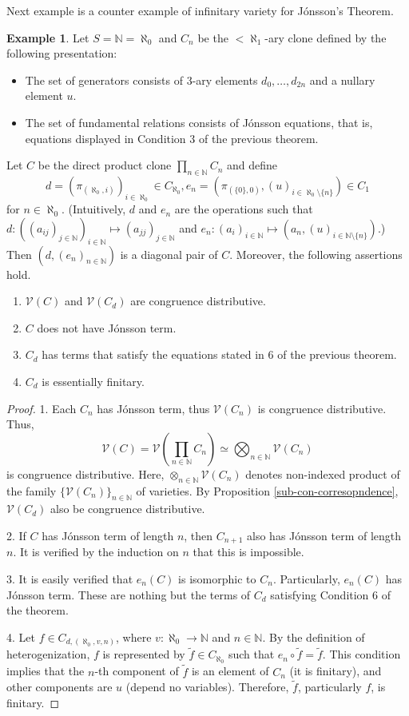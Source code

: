 \documentclass[a4paper,10pt]{article}
\theoremstyle{definition}
\newtheorem{eg}[df]{Example}
\newcommand\ra{\rightarrow}
\newcommand\iso{{\simeq}}
\newcommand\sm{\setminus}
\newcommand\mc{\mathclose}
\newcommand\N{\mathbb{N}}
\newcommand\V{\mathcal{V}}
\begin{document}
Next example is a counter example of infinitary variety for J\'onsson's Theorem.
\begin{eg}
Let $S=\N=\aleph_0$ and $C_n$ be the $<\mc\aleph_1$-ary clone defined by the following presentation:
\begin{itemize}
\item
The set of generators consists of 3-ary elements $d_0,\dots,d_{2n}$ and a nullary element $u$.
\item
The set of fundamental relations consists of J\'onsson equations, that is,
equations displayed in Condition 3 of the previous theorem.
\end{itemize}
Let $C$ be the direct product clone $\prod_{n\in\N}C_n$ and define
\[
d=(\pi_{(\aleph_0,i)})_{i\in\aleph_0}\in C_{\aleph_0},
e_n=(\pi_{(\{0\},0)},(u)_{i\in\aleph_0\sm\{n\}})\in C_1
\]
for $n\in\aleph_0$.
(Intuitively, $d$ and $e_n$ are the operations such that
$d:((a_{ij})_{j\in \N})_{i\in \N}\mapsto (a_{jj})_{j\in \N}$ and 
\mbox{$e_n:(a_i)_{i\in\N}\mapsto (a_n,(u)_{i\in\N\sm\{n\}})$}.) 
Then $(d,(e_n)_{n\in\N})$ is a diagonal pair of $C$.
Moreover, the following assertions hold.
\begin{enumerate}
\item
$\V(C)$ and $\V(C_d)$ are congruence distributive.
\item
$C$ does not have J\'onsson term.
\item
$C_d$ has terms that satisfy the equations stated in 6 of the previous theorem.
\item
$C_d$ is essentially finitary.
\end{enumerate}
\end{eg}
\begin{proof}
1. Each $C_n$ has J\'onsson term, thus $\V(C_n)$ is congruence distributive.
Thus,
\[
\V(C)=\V\left(\prod_{n\in\N}C_n\right)\iso \bigotimes_{n\in\N}\V(C_n)
\]
is congruence distributive. Here, $\otimes_{n\in\N}\V(C_n)$ denotes
non-indexed product of the family $\{\V(C_n)\}_{n\in \N}$ of varieties.
By Proposition \ref{sub-con-corresopndence}, $\V(C_d)$ also be congruence distributive.

2. If $C$ has J\'onsson term of length $n$, then $C_{n+1}$ also has J\'onsson term of length $n$.
It is verified by the induction on $n$ that this is impossible.

3. It is easily verified that $e_n(C)$ is isomorphic to $C_n$.
Particularly, $e_n(C)$ has J\'onsson term.
These are nothing but the terms of $C_d$ satisfying Condition 6 of the theorem.

4. Let $f\in C_{d,(\aleph_0,v,n)}$, where $v:\aleph_0\ra \N$ and $n\in\N$.
By the definition of heterogenization, $f$ is represented by $\tilde{f}\in C_{\aleph_0}$
such that $e_n\circ\tilde{f}=\tilde{f}$. This condition implies that
the $n$-th component of $\tilde{f}$ is an element of $C_n$ (it is finitary),
and other components are $u$ (depend no variables).
Therefore, $\tilde{f}$, particularly $f$, is finitary.
\end{proof}
\end{document}
